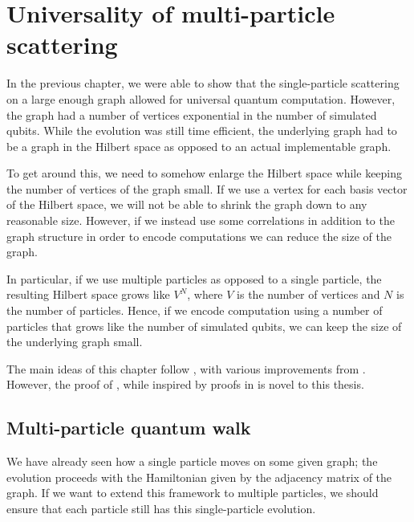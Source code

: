 \documentclass[../thesis-main/thesis-main]{subfiles}
\begin{document}
\chapter{Universality of multi-particle scattering}



In the previous chapter, we were able to show that the single-particle scattering on a large enough graph allowed for universal quantum computation.  However, the graph had a number of vertices exponential in the number of simulated qubits.  While the evolution was still time efficient, the underlying graph had to be a graph in the Hilbert space as opposed to an actual implementable graph.

To get around this, we need to somehow enlarge the Hilbert space while keeping the number of vertices of the graph small.  If we use a vertex for each basis vector of the Hilbert space, we will not be able to shrink the graph down to any reasonable size.  However, if we instead use some correlations in addition to the graph structure in order to encode computations we can reduce the size of the graph.

In particular, if we use multiple particles as opposed to a single particle, the resulting Hilbert space grows like $V^N$, where $V$ is the number of vertices and $N$ is the number of particles.  Hence, if we encode computation using a number of particles that grows like the number of simulated qubits, we can keep the size of the underlying graph small.

The main ideas of this chapter follow \cite{MPQW}, with various improvements from \cite{MomSwitches}.  However, the proof of , while inspired by proofs in \cite{MPQW} is novel to this thesis.


\section{Multi-particle quantum walk}

We have already seen how a single particle moves on some given graph; the evolution proceeds with the Hamiltonian given by the adjacency matrix of the graph.  If we want to extend this framework to multiple particles, we should ensure that each particle still has this single-particle evolution.
\end{document}
